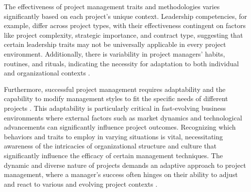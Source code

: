 \documentclass{article}
\begin{document}




The effectiveness of project management traits and methodologies varies significantly based on each project's unique context. Leadership competencies, for example, differ across project types, with their effectiveness contingent on factors like project complexity, strategic importance, and contract type, suggesting that certain leadership traits may not be universally applicable in every project environment\cite{muller2010leadership}. Additionally, there is variability in project managers'  habits, routines, and rituals, indicating the necessity for adaptation to both individual and organizational contexts \cite{sigurdhssonpatterns}.

Furthermore, successful project management requires adaptability and the capability to modify management styles to fit the specific needs of different projects \cite{markopoulos2005project}. This adaptability is particularly critical in fast-evolving business environments where external factors such as market dynamics and technological advancements can significantly influence project outcomes. Recognizing which behaviors and traits to employ in varying situations is vital, necessitating awareness of the intricacies of organizational structure and culture that significantly influence the efficacy of certain management techniques. The dynamic and diverse nature of projects demands an adaptive approach to project management, where a manager's success often hinges on their ability to adjust and react to various and evolving project contexts \cite{pollack2016project}.
\end{document}
